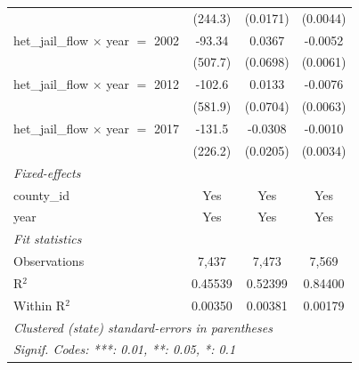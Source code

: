 \begin{tabular}{lccc}
                                                         & (244.3)                          & (0.0171)                     & (0.0044)\\   
   het\_jail\_flow $\times$ year $=$ 2002                & -93.34                           & 0.0367                       & -0.0052\\   
                                                         & (507.7)                          & (0.0698)                     & (0.0061)\\   
   het\_jail\_flow $\times$ year $=$ 2012                & -102.6                           & 0.0133                       & -0.0076\\   
                                                         & (581.9)                          & (0.0704)                     & (0.0063)\\   
   het\_jail\_flow $\times$ year $=$ 2017                & -131.5                           & -0.0308                      & -0.0010\\   
                                                         & (226.2)                          & (0.0205)                     & (0.0034)\\   
   \midrule
   \emph{Fixed-effects}\\
   county\_id                                            & Yes                              & Yes                          & Yes\\  
   year                                                  & Yes                              & Yes                          & Yes\\  
   \midrule
   \emph{Fit statistics}\\
   Observations                                          & 7,437                            & 7,473                        & 7,569\\  
   R$^2$                                                 & 0.45539                          & 0.52399                      & 0.84400\\  
   Within R$^2$                                          & 0.00350                          & 0.00381                      & 0.00179\\  
   \midrule \midrule
   \multicolumn{4}{l}{\emph{Clustered (state) standard-errors in parentheses}}\\
   \multicolumn{4}{l}{\emph{Signif. Codes: ***: 0.01, **: 0.05, *: 0.1}}\\
\end{tabular}
\par\endgroup


